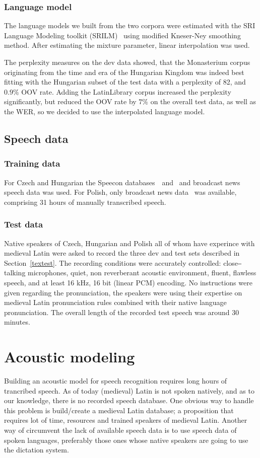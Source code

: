 \documentclass[runningheads,a4paper]{llncs}
\begin{document}
\subsubsection{Language model}
The language models we built from the two corpora were estimated with the SRI Language Modeling toolkit (SRILM)~\cite{srilm} using modified Kneser-Ney smoothing method.
After estimating the mixture parameter, linear interpolation was used.

The perplexity measures on the dev data showed, that the Monasterium corpus originating from the time and era of the Hungarian Kingdom was indeed best fitting with the Hungarian subset of the test data with a perplexity of 82, and $0.9\%$ OOV rate.
Adding the LatinLibrary corpus increased the perplexity significantly, but reduced the OOV rate by $7\%$ on the overall test data, as well as the WER, so we decided to use the interpolated language model.

\subsection{Speech data}
\subsubsection{Training data}
For Czech and Hungarian the Speecon databases~\cite{czech}~and~\cite{hungarian} and broadcast news speech data was used.
For Polish, only broadcast news data~\cite{polish} was available, comprising 31 hours of manually transcribed speech.
\subsubsection{Test data}
Native speakers of Czech, Hungarian and Polish all of whom have experince with medieval Latin were asked to record the three dev and test sets described in Section~\ref{textest}.
The recording conditions were accurately controlled: close‒talking microphones, quiet, non reverberant acoustic environment, fluent, flawless speech, and at least 16 kHz, 16 bit (linear PCM) encoding.
No instructions were given regarding the pronunciation, the speakers were using their expertise on medieval Latin pronunciation rules combined with their native language pronunciation.
The overall length of the recorded test speech was around 30 minutes.

\section{Acoustic modeling}\label{AM}
Building an acoustic model for speech recognition requires long hours of trancribed speech.
As of today (medieval) Latin is not spoken natively, and as to our knowledge, there is no recorded speech database.
One obvious way to handle this problem is build/create a medieval Latin database; a proposition that requires lot of time, resources and trained speakers of medieval Latin. 
Another way of circumvent the lack of available speech data is to use speech data of spoken languages, preferably those ones whose native speakers are going to use the dictation system. 
\end{document}
